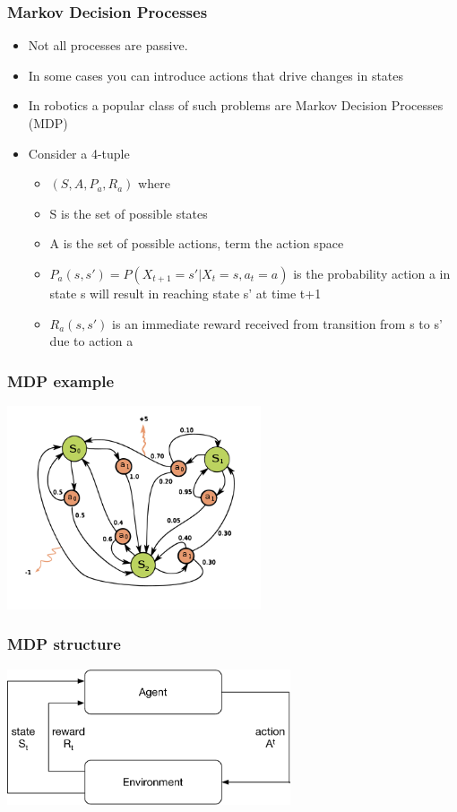 \documentclass[10pt]{beamer}
\begin{document}
\begin{frame}
  \frametitle{Markov Decision Processes}
  \begin{itemize}
  \item Not all processes are passive.
  \item In some cases you can introduce actions that drive changes in states
  \item In robotics a popular class of such problems are Markov Decision Processes (MDP)
  \item Consider a 4-tuple
    \begin{itemize}
    \item $(S, A, P_a, R_a)$ where
    \item S is the set of possible states
    \item A is the set of possible actions, term the action space
    \item $P_a(s,s') = P(X_{t+1}= s' | X_t = s, a_t = a)$ is the probability action a in state s will result in reaching state s' at time t+1
    \item $R_a(s,s')$ is an immediate reward received from transition from s to s' due to action a
    \end{itemize}
  \end{itemize}
\end{frame}

\begin{frame}
  \frametitle{MDP example}
  \vfill
  \centerline{\includegraphics[height=6cm]{Markov_Decision_Process.svg.png}}
\end{frame}

\begin{frame}
  \frametitle{MDP structure}
  \vfill
  \centerline{\includegraphics[height=4cm]{mdp-process}}
\end{frame}
\end{document}
